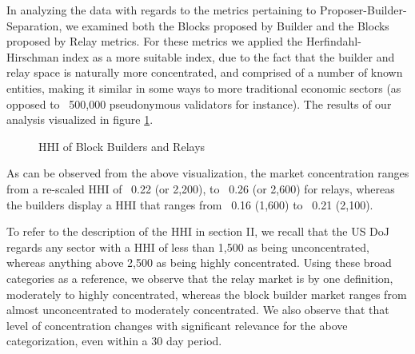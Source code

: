\documentclass[conference]{IEEEtran}
\begin{document}
In analyzing the data with regards to the metrics pertaining to Proposer-Builder-Separation, we examined both the Blocks proposed by Builder and the Blocks proposed by Relay metrics.  For these metrics we applied the Herfindahl-Hirschman index as a more suitable index, due to the fact that the builder and relay space is naturally more concentrated, and comprised of a number of known entities, making it similar in some ways to more traditional economic sectors (as opposed to ~500,000 pseudonymous validators for instance).  The results of our analysis visualized in figure \ref{fig:HHI block builder relays}.

\begin{figure}[ht]
\caption{HHI of Block Builders and Relays}
\label{fig:HHI block builder relays}
\end{figure}

As can be observed from the above visualization, the market concentration ranges from a re-scaled HHI of ~0.22 (or 2,200), to ~0.26 (or 2,600) for relays, whereas the builders display a HHI that ranges from ~0.16 (1,600) to ~0.21 (2,100).

To refer to the description of the HHI in section II, we recall that the US DoJ regards any sector with a HHI of less than 1,500 as being unconcentrated, whereas anything above 2,500 as being highly concentrated.  Using these broad categories as a reference, we observe that the relay market is by one definition, moderately to highly concentrated, whereas the block builder market ranges from almost unconcentrated to moderately concentrated.  We also observe that that level of concentration changes with significant relevance for the above categorization, even within a 30 day period.
\end{document}
